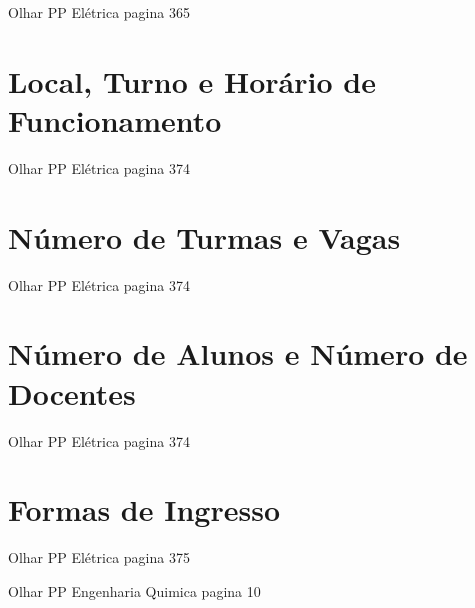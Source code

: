 Olhar PP Elétrica pagina 365

\section{Local, Turno e Horário de Funcionamento}

Olhar PP Elétrica pagina 374

\section{Número de Turmas e Vagas}

Olhar PP Elétrica pagina 374

\section{Número de Alunos e Número de Docentes}

Olhar PP Elétrica pagina 374

\section{Formas de Ingresso}

Olhar PP Elétrica pagina 375

Olhar PP Engenharia Quimica pagina 10




